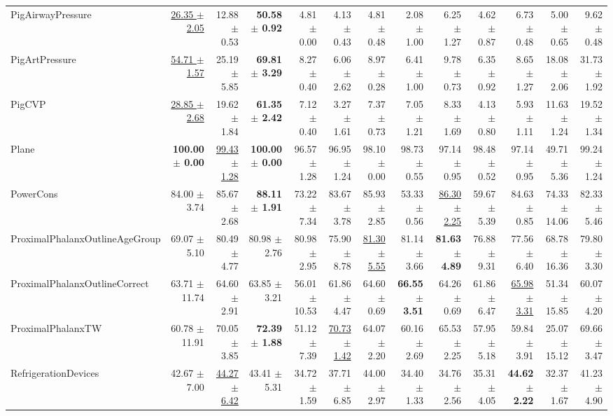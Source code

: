 \begin{landscape}
\begin{longtable}{lrrrrrrrrrrrr}
PigAirwayPressure & \underline{26.35 $\pm$ 2.05} & 12.88 $\pm$ 0.53 & \textbf{50.58 $\pm$ 0.92} & 4.81 $\pm$ 0.00 & 4.13 $\pm$ 0.43 & 4.81 $\pm$ 0.48 & 2.08 $\pm$ 1.00 & 6.25 $\pm$ 1.27 & 4.62 $\pm$ 0.87 & 6.73 $\pm$ 0.48 & 5.00 $\pm$ 0.65 & 9.62 $\pm$ 0.48 \\
PigArtPressure & \underline{54.71 $\pm$ 1.57} & 25.19 $\pm$ 5.85 & \textbf{69.81 $\pm$ 3.29} & 8.27 $\pm$ 0.40 & 6.06 $\pm$ 2.62 & 8.97 $\pm$ 0.28 & 6.41 $\pm$ 1.00 & 9.78 $\pm$ 0.73 & 6.35 $\pm$ 0.92 & 8.65 $\pm$ 1.27 & 18.08 $\pm$ 2.06 & 31.73 $\pm$ 1.92 \\
PigCVP & \underline{28.85 $\pm$ 2.68} & 19.62 $\pm$ 1.84 & \textbf{61.35 $\pm$ 2.42} & 7.12 $\pm$ 0.40 & 3.27 $\pm$ 1.61 & 7.37 $\pm$ 0.73 & 7.05 $\pm$ 1.21 & 8.33 $\pm$ 1.69 & 4.13 $\pm$ 0.80 & 5.93 $\pm$ 1.11 & 11.63 $\pm$ 1.24 & 19.52 $\pm$ 1.34 \\
Plane & \textbf{100.00 $\pm$ 0.00} & \underline{99.43 $\pm$ 1.28} & \textbf{100.00 $\pm$ 0.00} & 96.57 $\pm$ 1.28 & 96.95 $\pm$ 1.24 & 98.10 $\pm$ 0.00 & 98.73 $\pm$ 0.55 & 97.14 $\pm$ 0.95 & 98.48 $\pm$ 0.52 & 97.14 $\pm$ 0.95 & 49.71 $\pm$ 5.36 & 99.24 $\pm$ 1.24 \\
PowerCons & 84.00 $\pm$ 3.74 & 85.67 $\pm$ 2.68 & \textbf{88.11 $\pm$ 1.91} & 73.22 $\pm$ 7.34 & 83.67 $\pm$ 3.78 & 85.93 $\pm$ 2.85 & 53.33 $\pm$ 0.56 & \underline{86.30 $\pm$ 2.25} & 59.67 $\pm$ 5.39 & 84.63 $\pm$ 0.85 & 74.33 $\pm$ 14.06 & 82.33 $\pm$ 5.46 \\
ProximalPhalanxOutlineAgeGroup & 69.07 $\pm$ 5.10 & 80.49 $\pm$ 4.77 & 80.98 $\pm$ 2.76 & 80.98 $\pm$ 2.95 & 75.90 $\pm$ 8.78 & \underline{81.30 $\pm$ 5.55} & 81.14 $\pm$ 3.66 & \textbf{81.63 $\pm$ 4.89} & 76.88 $\pm$ 9.31 & 77.56 $\pm$ 6.40 & 68.78 $\pm$ 16.36 & 79.80 $\pm$ 3.30 \\
ProximalPhalanxOutlineCorrect & 63.71 $\pm$ 11.74 & 64.60 $\pm$ 2.91 & 63.85 $\pm$ 3.21 & 56.01 $\pm$ 10.53 & 61.86 $\pm$ 4.47 & 64.60 $\pm$ 0.69 & \textbf{66.55 $\pm$ 3.51} & 64.26 $\pm$ 0.69 & 61.86 $\pm$ 6.47 & \underline{65.98 $\pm$ 3.31} & 51.34 $\pm$ 15.85 & 60.07 $\pm$ 4.20 \\
ProximalPhalanxTW & 60.78 $\pm$ 11.91 & 70.05 $\pm$ 3.85 & \textbf{72.39 $\pm$ 1.88} & 51.12 $\pm$ 7.39 & \underline{70.73 $\pm$ 1.42} & 64.07 $\pm$ 2.20 & 60.16 $\pm$ 2.69 & 65.53 $\pm$ 2.25 & 57.95 $\pm$ 5.18 & 59.84 $\pm$ 3.91 & 25.07 $\pm$ 15.12 & 69.66 $\pm$ 3.47 \\
RefrigerationDevices & 42.67 $\pm$ 7.00 & \underline{44.27 $\pm$ 6.42} & 43.41 $\pm$ 5.31 & 34.72 $\pm$ 1.59 & 37.71 $\pm$ 6.85 & 44.00 $\pm$ 2.97 & 34.40 $\pm$ 1.33 & 34.76 $\pm$ 2.56 & 35.31 $\pm$ 4.05 & \textbf{44.62 $\pm$ 2.22} & 32.37 $\pm$ 1.67 & 41.23 $\pm$ 4.90 \\

\end{longtable}
\end{landscape}
